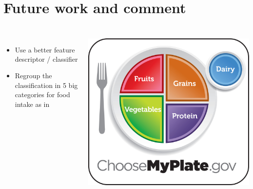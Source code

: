 \documentclass[aspectratio=169]{beamer}
\let\oldsection\section
\renewcommand{\section}[1]{
    \oldsection{#1}	
    \subsection{}
}
\newenvironment{myframe}[1][t]{\begin{frame}[#1]{\secname}{\subsecname}}{\end{frame}}
\begin{document}
    \section{Future work and comment}
    
    \begin{myframe}
        \begin{columns}
            \renewcommand{\baselinestretch}{1.5}\normalsize
            \begin{itemize}
                \item Use a better feature descriptor / classifier
                
                \vspace{1cm}
                
                \item Regroup the classification in 5 big categories for food intake as in \cite{Aizawa2013}

            \end{itemize}
            \centering
            \includegraphics[scale=0.25]{../img/choosemyplate.jpg}
        \end{columns}
        
    \end{myframe}
    
\end{document}
